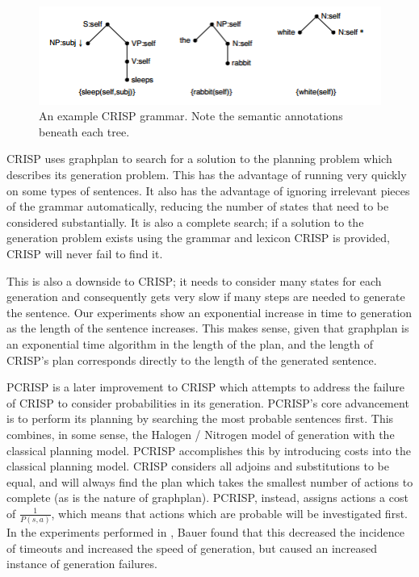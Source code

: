 \begin{figure}
\centering
\includegraphics{crisp-grammar.png}
\caption{An example CRISP grammar.  Note the semantic annotations
beneath each tree.}
\label{crisp-grammar}
\end{figure}

CRISP uses graphplan to search for a solution to the planning
problem which describes its generation problem.  This has
the advantage of running very quickly on some types of
sentences.  It also has the advantage of ignoring irrelevant
pieces of the grammar automatically, reducing the number
of states that need to be considered substantially.
It is also a complete search; if a solution to the generation
problem exists using the grammar and lexicon CRISP is provided,
CRISP will never fail to find it.

This is also a downside to CRISP; it needs to consider many
states for each generation and consequently gets very
slow if many steps are needed to generate the sentence.
Our experiments show an exponential increase in time to
generation as the length of the sentence increases.  This makes
sense, given that graphplan is an exponential time algorithm
in the length of the plan, and the length of CRISP's plan corresponds
directly to the length of the generated sentence.

PCRISP \cite{bauer_sentence_2010} is a later improvement to
CRISP which attempts to address the failure of CRISP to consider
probabilities in its generation.  PCRISP's core advancement is
to perform its planning by searching the most probable sentences
first.  This combines, in some sense, the Halogen / Nitrogen model
of generation with the classical planning model.  PCRISP accomplishes
this by introducing costs into the classical planning model.
CRISP considers all adjoins and substitutions to be equal, and
will always find the plan which takes the smallest number of actions
to complete (as is the nature of graphplan).  PCRISP, instead,
assigns actions a cost of $\frac{1}{P(s,a)}$, which means that
actions which are probable will be investigated first.  In the
experiments performed in \cite{bauer2009statistical},
Bauer found that this decreased the incidence of timeouts and
increased the speed of generation, but caused an increased instance of
generation failures.

